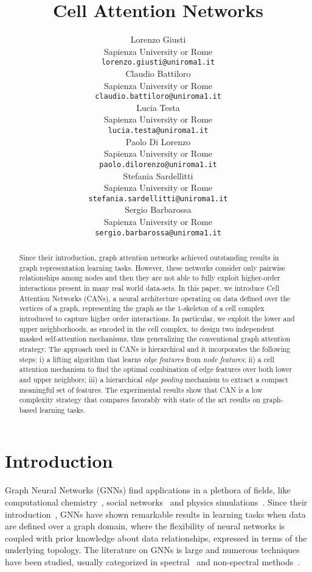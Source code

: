 \documentclass{article}
\title[Cell Attention Networks]{Cell Attention Networks}
\author[L. Giusti et al.]{Lorenzo Giusti\\
  Sapienza University or Rome\\
  \texttt{lorenzo.giusti@uniroma1.it} \\  
  \And
  Claudio Battiloro\\
  Sapienza University or Rome\\
  \texttt{claudio.battiloro@uniroma1.it} \\
  \And
  Lucia Testa \\
  Sapienza University or Rome\\
  \texttt{lucia.testa@uniroma1.it} \\
  \And
  Paolo Di Lorenzo \\
  Sapienza University or Rome\\
  \texttt{paolo.dilorenzo@uniroma1.it} \\
  \And
  Stefania Sardellitti \\
  Sapienza University or Rome\\
  \texttt{stefania.sardellitti@uniroma1.it}\\
  \And
  Sergio Barbarossa \\
  Sapienza University or Rome\\
  \texttt{sergio.barbarossa@uniroma1.it} 
}
\begin{document}
\maketitle

\begin{abstract}
Since their introduction, graph attention networks achieved outstanding results in graph representation learning tasks. However, these networks consider only pairwise relationships among nodes and then they are not able to fully exploit higher-order interactions present in many real world data-sets. In this paper, we introduce Cell Attention Networks (CANs), a neural architecture operating on data defined over the vertices of a graph, representing the graph as the 1-skeleton of a cell complex introduced to capture higher order interactions. In particular, we exploit the lower and upper neighborhoods, as encoded in the cell complex, to design two independent masked self-attention mechanisms, thus generalizing the conventional graph attention strategy. The approach used in CANs is hierarchical and it incorporates the following steps: i) a lifting algorithm that learns {\it edge features} from {\it node features}; ii) a cell attention mechanism to find the optimal combination of edge features over both  lower and upper neighbors; iii)  a hierarchical {\it edge pooling} mechanism to extract a compact meaningful set of features. The experimental results show that CAN is a low complexity strategy that compares favorably with state of the art results on graph-based learning tasks.
\end{abstract}


\section{Introduction}

Graph Neural Networks (GNNs) find applications in a plethora of fields, like computational chemistry~\cite{gilmer2017neural}, social networks~\cite{fan2019graph} and physics simulations~\cite{shlomi2020graph}. Since their introduction~\cite{gori2005new, scarselli2008graph}, GNNs have shown remarkable results in learning tasks when data are defined over a graph domain, where the flexibility of neural networks is coupled with prior knowledge about data relationships, expressed in terms of the underlying topology. The literature on GNNs is large and numerous techniques have been studied, usually categorized in spectral~\cite{Bruna19, kipf2016semi} and non-spectral methods~\cite{hamilton2017inductive, DuvenaudMABHAA15, atwood2016diffusion}. 
\end{document}
